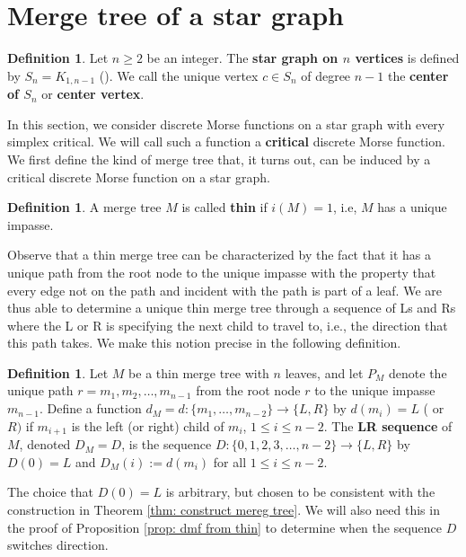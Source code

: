 \documentclass{article}
\theoremstyle{definition}
\newtheorem{definition}{Definition}[section]
\newtheorem{defn}[thm]  {Definition}
\begin{document}
\section{Merge tree of a star graph}\label{Merge tree of a star graph}

\begin{defn} Let $n\geq 2$ be an integer. The \textbf{star graph on $n$ vertices} is defined by $S_n= K_{1,n-1}$ (\cite[p. 17]{H-69}).  We call the unique vertex $c\in S_n$ of degree $n-1$ the \textbf{center of $S_n$} or \textbf{center vertex}.
\end{defn}

In this section, we consider discrete Morse functions on a star graph with every simplex critical.  We will call such a function a \textbf{critical} discrete Morse function.  We first define the kind of merge tree that, it turns out, can be induced by a critical discrete Morse function on a star graph.

\begin{defn} A merge tree $M$ is called \textbf{thin} if $i(M)=1$, i.e, $M$ has a unique impasse.
\end{defn}

Observe that a thin merge tree can be characterized by the fact that it has a unique path from the root node to the unique impasse with the property that every edge not on the path and incident with the path is part of a leaf.  We are thus able to determine a unique thin merge tree through a sequence of Ls and Rs where the L or R is specifying the next child to travel to, i.e., the direction that this path takes.  We make this notion precise in the following definition.

\begin{definition}\label{def: unique path notation} Let $M$ be a thin merge tree with $n$ leaves, and let $P_M$ denote the unique path $r=m_1, m_2, \ldots, m_{n-1}$ from the root node $r$ to the unique impasse $m_{n-1}$.  Define a function $d_M=d\colon\{m_1, \ldots, m_{n-2}\}\to \{L,R\}$ by $d(m_i)=L$ ( or $R)$ if $m_{i+1}$ is the left (or right) child of $m_i$, $1\leq i\leq n-2$. The \textbf{LR sequence} of $M$, denoted $D_M=D$, is the sequence $D\colon \{0,1,2,3, \ldots, n-2\}\to \{L,R\}$ by $D(0)=L$ and $D_M(i):=d(m_i)$ for all $1\leq i \leq n-2$.
\end{definition}

The choice that $D(0)=L$ is arbitrary, but chosen to be consistent with the construction in Theorem \ref{thm: construct mereg tree}. We will also need this in the proof of Proposition \ref{prop: dmf from thin} to determine when the sequence $D$ switches direction.
\end{document}
